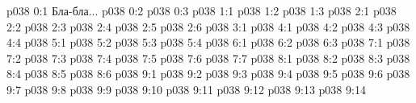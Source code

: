 \author{Мелхиседек}
\vs p038 0:1  Бла-бла...
\vs p038 0:2 \pc 
\vs p038 0:3 
\vs p038 1:1 
\vs p038 1:2 
\vs p038 1:3 
\vs p038 2:1 
\vs p038 2:2 \pc 
\vs p038 2:3 
\vs p038 2:4 \pc 
\vs p038 2:5 \pc 
\vs p038 2:6 
\vs p038 3:1 
\vs p038 4:1 
\vs p038 4:2 
\vs p038 4:3 \pc 
\vs p038 4:4 
\vs p038 5:1 
\vs p038 5:2 
\vs p038 5:3 
\vs p038 5:4 
\vs p038 6:1 
\vs p038 6:2 
\vs p038 6:3 
\vs p038 7:1 
\vs p038 7:2 
\vs p038 7:3 \pc 
\vs p038 7:4 
\vs p038 7:5 \pc 
\vs p038 7:6 \pc 
\vs p038 7:7 
\vs p038 8:1 
\vs p038 8:2 
\vs p038 8:3 
\vs p038 8:4 
\vs p038 8:5 \pc 
\vs p038 8:6 
\vs p038 9:1 
\vs p038 9:2 
\vs p038 9:3 
\vs p038 9:4 
\vs p038 9:5 \pc 
\vs p038 9:6 
\vs p038 9:7 
\vs p038 9:8 
\vs p038 9:9 
\vs p038 9:10 \pc 
\vs p038 9:11 
\vs p038 9:12 
\vs p038 9:13 \pc 
\vsetoff
\vs p038 9:14 
\quizlink
